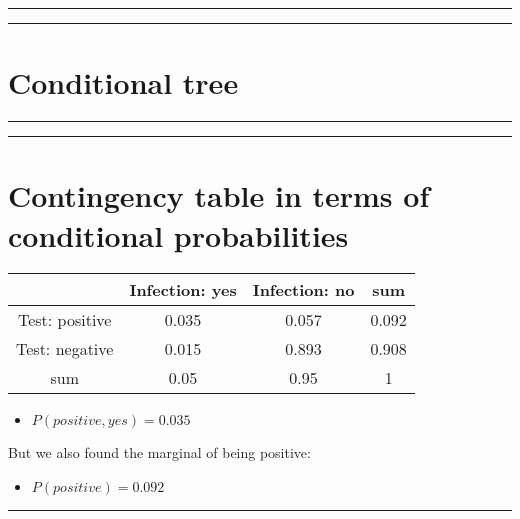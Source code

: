 \documentclass[
]{book}
\providecommand{\tightlist}{%
  \setlength{\itemsep}{0pt}\setlength{\parskip}{0pt}}
\begin{document}
\begin{center}\rule{0.5\linewidth}{0.5pt}\end{center}

\begin{center}\rule{0.5\linewidth}{0.5pt}\end{center}

\hypertarget{conditional-tree}{%
\section{Conditional tree}\label{conditional-tree}}

\begin{center}\rule{0.5\linewidth}{0.5pt}\end{center}

\begin{center}\rule{0.5\linewidth}{0.5pt}\end{center}

\hypertarget{contingency-table-in-terms-of-conditional-probabilities-1}{%
\section{Contingency table in terms of conditional probabilities}\label{contingency-table-in-terms-of-conditional-probabilities-1}}

\begin{longtable}[]{@{}cccc@{}}
\toprule
& Infection: yes & Infection: no & sum \\
\midrule
\endhead
Test: positive & 0.035 & 0.057 & 0.092 \\
Test: negative & 0.015 & 0.893 & 0.908 \\
sum & 0.05 & 0.95 & 1 \\
\bottomrule
\end{longtable}

\begin{itemize}
\tightlist
\item
  \(P(positive,yes)= 0.035\)
\end{itemize}

But we also found the marginal of being positive:

\begin{itemize}
\tightlist
\item
  \(P(positive)=0.092\)
\end{itemize}

\begin{center}\rule{0.5\linewidth}{0.5pt}\end{center}
\end{document}
